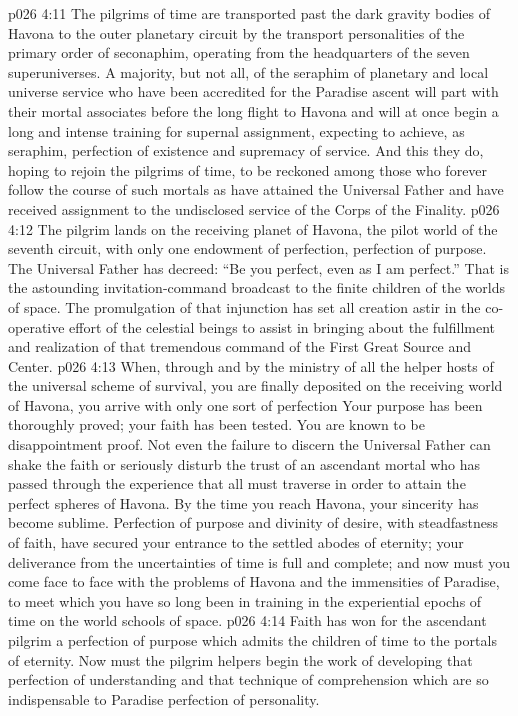 \vs p026 4:11 The pilgrims of time are transported past the dark gravity bodies of Havona to the outer planetary circuit by the transport personalities of the primary order of seconaphim, operating from the headquarters of the seven superuniverses. A majority, but not all, of the seraphim of planetary and local universe service who have been accredited for the Paradise ascent will part with their mortal associates before the long flight to Havona and will at once begin a long and intense training for supernal assignment, expecting to achieve, as seraphim, perfection of existence and supremacy of service. And this they do, hoping to rejoin the pilgrims of time, to be reckoned among those who forever follow the course of such mortals as have attained the Universal Father and have received assignment to the undisclosed service of the Corps of the Finality.
\vs p026 4:12 The pilgrim lands on the receiving planet of Havona, the pilot world of the seventh circuit, with only one endowment of perfection, perfection of purpose. The Universal Father has decreed: “Be you perfect, even as I am perfect.” That is the astounding invitation\hyp{}command broadcast to the finite children of the worlds of space. The promulgation of that injunction has set all creation astir in the co\hyp{}operative effort of the celestial beings to assist in bringing about the fulfillment and realization of that tremendous command of the First Great Source and Center.
\vs p026 4:13 When, through and by the ministry of all the helper hosts of the universal scheme of survival, you are finally deposited on the receiving world of Havona, you arrive with only one sort of perfection Your purpose has been thoroughly proved; your faith has been tested. You are known to be disappointment proof. Not even the failure to discern the Universal Father can shake the faith or seriously disturb the trust of an ascendant mortal who has passed through the experience that all must traverse in order to attain the perfect spheres of Havona. By the time you reach Havona, your sincerity has become sublime. Perfection of purpose and divinity of desire, with steadfastness of faith, have secured your entrance to the settled abodes of eternity; your deliverance from the uncertainties of time is full and complete; and now must you come face to face with the problems of Havona and the immensities of Paradise, to meet which you have so long been in training in the experiential epochs of time on the world schools of space.\plusone
\vs p026 4:14 Faith has won for the ascendant pilgrim a perfection of purpose which admits the children of time to the portals of eternity. Now must the pilgrim helpers begin the work of developing that perfection of understanding and that technique of comprehension which are so indispensable to Paradise perfection of personality.
